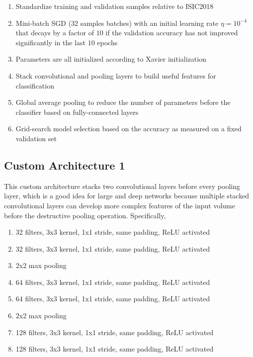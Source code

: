 \begin{enumerate}
    \item Standardize training and validation samples relative to ISIC2018
    \item Mini-batch \ac{SGD} (32 samples batches) with an initial learning rate $\eta = 10^{-4}$ that decays by a factor of $10$ if the validation accuracy has not improved significantly in the last $10$ epochs
    \item Parameters are all initialized according to Xavier initialization
    \item Stack convolutional and pooling layers to build useful features for classification
    \item Global average pooling to reduce the number of parameters before the classifier based on fully-connected layers
    \item Grid-search model selection based on the accuracy as measured on a fixed validation set
\end{enumerate}

\subsection{Custom Architecture 1}

This custom architecture stacks two convolutional layers before every pooling layer, which is a good idea for large and deep networks because multiple stacked convolutional layers can develop more complex features of the input volume before the destructive pooling operation. Specifically,

\begin{enumerate}
    \item 32 filters, 3x3 kernel, 1x1 stride, same padding, ReLU activated
    \item 32 filters, 3x3 kernel, 1x1 stride, same padding, ReLU activated
    \item 2x2 max pooling
    \item 64 filters, 3x3 kernel, 1x1 stride, same padding, ReLU activated
    \item 64 filters, 3x3 kernel, 1x1 stride, same padding, ReLU activated
    \item 2x2 max pooling
    \item 128 filters, 3x3 kernel, 1x1 stride, same padding, ReLU activated
    \item 128 filters, 3x3 kernel, 1x1 stride, same padding, ReLU activated
\end{enumerate}

